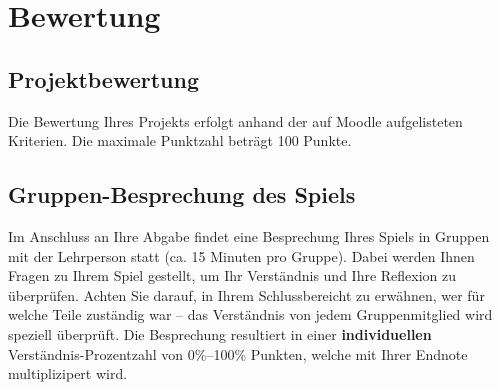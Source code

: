 
\section{Bewertung}
\subsection{Projektbewertung}
Die Bewertung Ihres Projekts erfolgt anhand der auf Moodle aufgelisteten Kriterien. Die maximale Punktzahl beträgt 100 Punkte.

\subsection{Gruppen-Besprechung des Spiels}

Im Anschluss an Ihre Abgabe findet eine Besprechung Ihres Spiels in Gruppen mit der Lehrperson statt (ca. 15 Minuten pro Gruppe). Dabei werden Ihnen Fragen zu Ihrem Spiel gestellt, um Ihr Verständnis und Ihre Reflexion zu überprüfen. Achten Sie darauf, in Ihrem Schlussbereicht zu erwähnen, wer für welche Teile zuständig war -- das Verständnis von jedem Gruppenmitglied wird speziell überprüft. Die Besprechung resultiert in einer \textbf{individuellen} Verständnis-Prozentzahl von 0\%--100\% Punkten, welche mit Ihrer Endnote multiplizipert wird.

